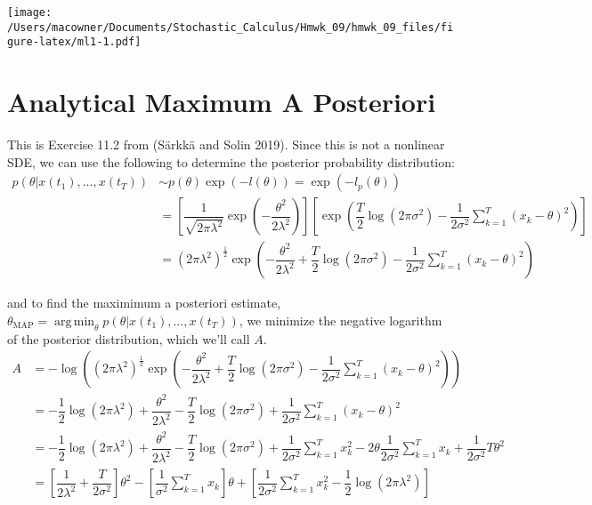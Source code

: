 \documentclass[]{article}
\DeclareMathOperator*{\argmin}{arg\,min}
\begin{document}
\texttt{[image: /Users/macowner/Documents/Stochastic\_Calculus/Hmwk\_09/hmwk\_09\_files/figure-latex/ml1-1.pdf]}

\hypertarget{analytical-maximum-a-posteriori}{%
\section{Analytical Maximum A
Posteriori}\label{analytical-maximum-a-posteriori}}

This is Exercise 11.2 from (Särkkä and Solin 2019). Since this is not a
nonlinear SDE, we can use the following to determine the posterior
probability distribution: \begin{align}
p\left(\theta | x\left(t_1\right), \ldots, x\left(t_T\right)\right) &\sim
  p\left(\theta\right) \exp{\left( -l\left(\theta\right)\right)} = \exp{\left( -l_p\left( \theta \right) \right)}\\
&= \left[
    \dfrac{1}{\sqrt{2\pi\lambda^2}} \exp{\left(- \dfrac{\theta^2}{2\lambda^2}\right)}
\right]
\left[
    \exp{\left(
        \dfrac{T}{2} \log{\left( 2 \pi \sigma^2 \right)} - \dfrac{1}{2 \sigma^2} \sum_{k=1}^{T} \left( x_k - \theta \right)^2
    \right)}
\right]\\
&= \left( 2 \pi \lambda^2 \right)^\frac{1}{2}
    \exp{ \left(
        - \dfrac{\theta^2}{2\lambda^2} + \dfrac{T}{2} \log{\left( 2 \pi \sigma^2 \right)} - \dfrac{1}{2 \sigma^2} \sum_{k=1}^{T} \left( x_k - \theta \right)^2
    \right) }
\end{align}

and to find the maximimum a posteriori estimate,
\(\theta_{\textrm{MAP}} = \argmin_\theta p\left(\theta | x\left(t_1\right), \ldots, x\left(t_T\right)\right)\),
we minimize the negative logarithm of the posterior distribution, which
we'll call \(A\). \begin{align}
A &=
- \log{\left(
\left( 2 \pi \lambda^2 \right)^\frac{1}{2}
    \exp{ \left(
        - \dfrac{\theta^2}{2\lambda^2} + \dfrac{T}{2} \log{\left( 2 \pi \sigma^2 \right)} - \dfrac{1}{2 \sigma^2} \sum_{k=1}^{T} \left( x_k - \theta \right)^2
    \right) }
\right)}\\
&= - \dfrac{1}{2}\log{\left( 2 \pi \lambda^2 \right)}
+ \dfrac{\theta^2}{2\lambda^2} - \dfrac{T}{2} \log{\left( 2 \pi \sigma^2 \right)} + \dfrac{1}{2 \sigma^2} \sum_{k=1}^{T} \left( x_k - \theta \right)^2\\
&= - \dfrac{1}{2}\log{\left( 2 \pi \lambda^2 \right)}
+ \dfrac{\theta^2}{2\lambda^2} - \dfrac{T}{2} \log{\left( 2 \pi \sigma^2 \right)}
  + \dfrac{1}{2 \sigma^2} \sum_{k=1}^{T} x_k^2
  -2 \theta \dfrac{1}{2 \sigma^2} \sum_{k=1}^{T} x_k
  + \dfrac{1}{2 \sigma^2} T \theta^2\\
&= \left[ \dfrac{1}{2\lambda^2} + \dfrac{T}{2\sigma^2} \right]\theta^2
- \left[\dfrac{1}{\sigma^2} \sum_{k=1}^T x_k \right] \theta
+ \left[ \dfrac{1}{2 \sigma^2} \sum_{k=1}^{T} x_k^2
- \dfrac{1}{2}\log{\left( 2 \pi \lambda^2 \right)}
\right]
\end{align}
\end{document}
